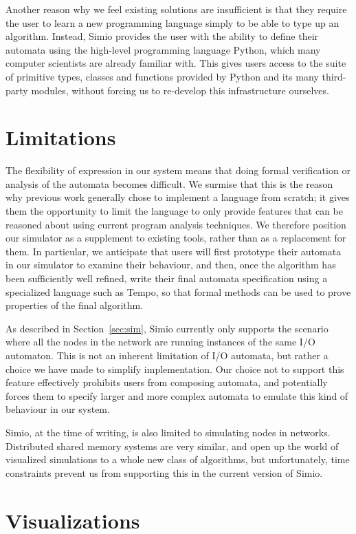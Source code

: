 \documentclass{scrartcl}
\begin{document}
Another reason why we feel existing solutions are insufficient is that they
require the user to learn a new programming language simply to be able to type
up an algorithm. Instead, Simio provides the user with the ability to define
their automata using the high-level programming language Python, which many
computer scientists are already familiar with. This gives users access to the
suite of primitive types, classes and functions provided by Python and its many
third-party modules, without forcing us to re-develop this infrastructure
ourselves.

\section{Limitations}

The flexibility of expression in our system means that doing formal verification
or analysis of the automata becomes difficult. We surmise that this is the
reason why previous work generally chose to implement a language from scratch;
it gives them the opportunity to limit the language to only provide features
that can be reasoned about using current program analysis techniques. We
therefore position our simulator as a supplement to existing tools, rather than
as a replacement for them. In particular, we anticipate that users will first
prototype their automata in our simulator to examine their behaviour, and then,
once the algorithm has been sufficiently well refined, write their final
automata specification using a specialized language such as Tempo, so that
formal methods can be used to prove properties of the final algorithm.

As described in Section~\ref{sec:sim}, Simio currently only supports the
scenario where all the nodes in the network are running instances of the same
I/O automaton. This is not an inherent limitation of I/O automata, but rather a
choice we have made to simplify implementation. Our choice not to support this
feature effectively prohibits users from composing automata, and potentially
forces them to specify larger and more complex automata to emulate this kind of
behaviour in our system.

Simio, at the time of writing, is also limited to simulating nodes in networks.
Distributed shared memory systems are very similar, and open up the world of
visualized simulations to a whole new class of algorithms, but unfortunately,
time constraints prevent us from supporting this in the current version of
Simio.

\section{Visualizations}
\end{document}
